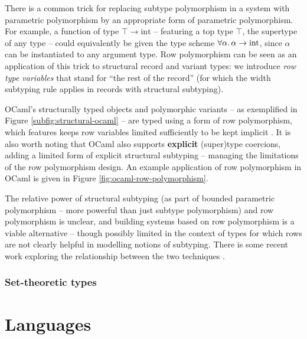 There is a common trick for replacing subtype polymorphism in a system with parametric polymorphism by an appropriate form of parametric polymorphism. For example, a function of type $\top \to \mathrm{int}$ -- featuring a top type $\top$, the supertype of any type -- could equivalently be given the type scheme $\forall \alpha \ldotp \alpha \to \mathrm{int}$, since $\alpha$ can be instantiated to any argument type.
Row polymorphism can be seen as an application of this trick to structural record and variant types: we introduce \emph{row type variables} that stand for \enquote{the rest of the record} (for which the width subtyping rule applies in records with structural subtyping).


OCaml's structurally typed objects \cite{objective-ml} and polymorphic variants \cite{polymorphic-variants} -- as exemplified in Figure \ref{subfig:structural-ocaml} -- are typed using a form of row polymorphism, which features keeps row variables limited sufficiently to be kept implicit \cite{objective-ml}. It is also worth noting that OCaml also supports \textbf{explicit} (super)type coercions, adding a limited form of explicit structural subtyping -- managing the limitations of the row polymorphism design. 
An example application of row polymorphism in OCaml is given in Figure \ref{fig:ocaml-row-polymorphism}.

The relative power of structural subtyping (as part of bounded parametric polymorphism -- more powerful than just subtype polymorphism) and row polymorphism is unclear, and building systems based on row polymorphism is a viable alternative -- though possibly limited in the context of types for which rows are not clearly helpful in modelling notions of subtyping. There is some recent work exploring the relationship between the two techniques \cite{disjoint-polymorphism}.

\subsubsection{Set-theoretic types}


\section{Languages}
\label{sec:languages}



